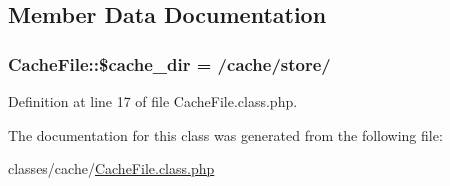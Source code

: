 \subsection{Member Data Documentation}
\subsubsection[{\texorpdfstring{\$cache\+\_\+dir}{$cache_dir}}]{\setlength{\rightskip}{0pt plus 5cm}Cache\+File\+::\$cache\+\_\+dir = /cache/store/\textquotesingle{}}\hypertarget{classCacheFile_a39d0574a28dd55f6b312811f411f2f51}{}\label{classCacheFile_a39d0574a28dd55f6b312811f411f2f51}


Definition at line 17 of file Cache\+File.\+class.\+php.



The documentation for this class was generated from the following file\+:\begin{DoxyCompactItemize}
\item 
classes/cache/\hyperlink{CacheFile_8class_8php}{Cache\+File.\+class.\+php}\end{DoxyCompactItemize}
